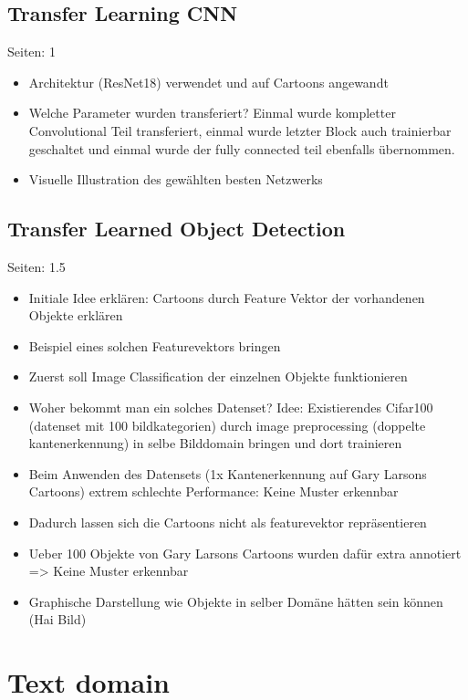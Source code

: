 \documentclass[draft,final,oneside]{vutinfth} %
\begin{document}
\subsection{Transfer Learning CNN}

Seiten: 1

\begin{itemize}
\item Architektur (ResNet18) verwendet und auf Cartoons angewandt
\item Welche Parameter wurden transferiert? Einmal wurde kompletter Convolutional Teil transferiert, einmal wurde letzter Block auch trainierbar geschaltet und einmal wurde der fully connected teil ebenfalls übernommen.
\item Visuelle Illustration des gewählten besten Netzwerks

\end{itemize}


\subsection{Transfer Learned Object Detection}

Seiten: 1.5

\begin{itemize}
\item Initiale Idee erklären: Cartoons durch Feature Vektor der vorhandenen Objekte erklären
\item Beispiel eines solchen Featurevektors bringen
\item Zuerst soll Image Classification der einzelnen Objekte funktionieren
\item Woher bekommt man ein solches Datenset? Idee: Existierendes Cifar100 (datenset mit 100 bildkategorien) durch image preprocessing (doppelte kantenerkennung) in selbe Bilddomain bringen und dort trainieren
\item Beim Anwenden des Datensets (1x Kantenerkennung auf Gary Larsons Cartoons) extrem schlechte Performance: Keine Muster erkennbar
\item Dadurch lassen sich die Cartoons nicht als featurevektor repräsentieren
\item Ueber 100 Objekte von Gary Larsons Cartoons wurden dafür extra annotiert => Keine Muster erkennbar
\item Graphische Darstellung wie Objekte in selber Domäne hätten sein können (Hai Bild)
\end{itemize}

\section{Text domain}
\end{document}
